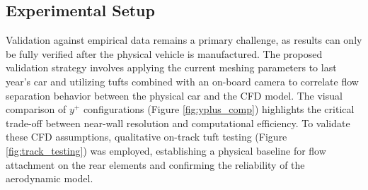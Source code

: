 \documentclass[a4paper]{article}
\begin{document}
	\begin{table}[H]
		\centering
		\renewcommand{\arraystretch}{1.3}
		\caption{Boundary Conditions by Patch and Field \cite{OpenFoamDoc}\cite{Welahetti}}
		\label{tab:boundary_conditions}
	\end{table}
	
	\subsection{Experimental Setup}
	Validation against empirical data remains a primary challenge, as results can only be fully verified after the physical vehicle is manufactured.
	The proposed validation strategy involves applying the current meshing parameters to last year's car and utilizing tufts combined with an on-board camera to correlate flow separation behavior between the physical car and the CFD model.
	The visual comparison of $y^+$ configurations (Figure \ref{fig:yplus_comp}) highlights the critical trade-off between near-wall resolution and computational efficiency. To validate these CFD assumptions, qualitative on-track tuft testing (Figure \ref{fig:track_testing}) was employed, establishing a physical baseline for flow attachment on the rear elements and confirming the reliability of the aerodynamic model.
	
\end{document}
